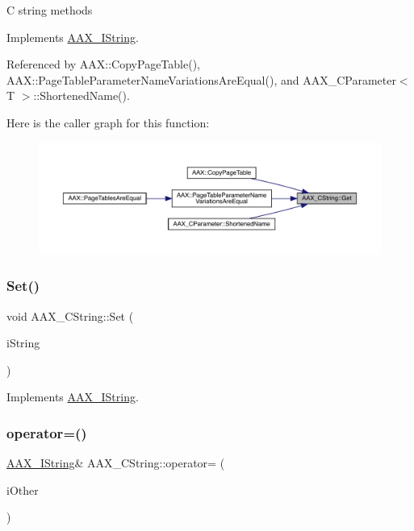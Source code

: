 C string methods 

Implements \mbox{\hyperlink{a01873_a63ff078d3df0d2e0c16c078a2ac4921e}{A\+A\+X\+\_\+\+I\+String}}.



Referenced by A\+A\+X\+::\+Copy\+Page\+Table(), A\+A\+X\+::\+Page\+Table\+Parameter\+Name\+Variations\+Are\+Equal(), and A\+A\+X\+\_\+\+C\+Parameter$<$ T $>$\+::\+Shortened\+Name().

Here is the caller graph for this function\+:
\nopagebreak
\begin{figure}[H]
\begin{center}
\leavevmode
\includegraphics[width=350pt]{a01573_aa0371a2a15513a4d160d4a741c0a953e_icgraph}
\end{center}
\end{figure}
\mbox{\label{a01573_afceddbfd8955a6aa9d127c03bf488cbc}} 
\subsubsection{\texorpdfstring{Set()}{Set()}}
{\footnotesize\ttfamily void A\+A\+X\+\_\+\+C\+String\+::\+Set (\begin{DoxyParamCaption}\item[{const char $\ast$}]{i\+String }\end{DoxyParamCaption})\hspace{0.3cm}{\ttfamily [virtual]}}



Implements \mbox{\hyperlink{a01873_a9ad28fba3ccc952de495f055a10e3b19}{A\+A\+X\+\_\+\+I\+String}}.

\mbox{\label{a01573_abc8ccb77fbd70435016d4d90588bc02e}} 
\subsubsection{\texorpdfstring{operator=()}{operator=()}\hspace{0.1cm}{\footnotesize\ttfamily [1/5]}}
{\footnotesize\ttfamily \mbox{\hyperlink{a01873}{A\+A\+X\+\_\+\+I\+String}}\& A\+A\+X\+\_\+\+C\+String\+::operator= (\begin{DoxyParamCaption}\item[{const \mbox{\hyperlink{a01873}{A\+A\+X\+\_\+\+I\+String}} \&}]{i\+Other }\end{DoxyParamCaption})\hspace{0.3cm}{\ttfamily [virtual]}}

